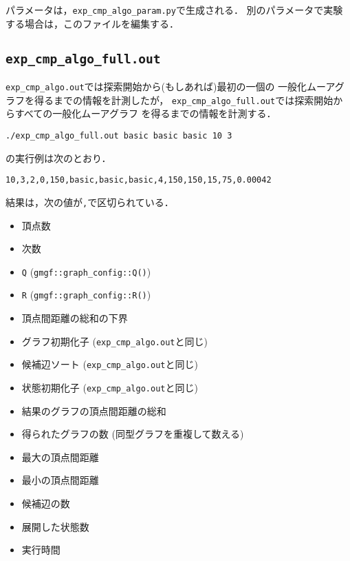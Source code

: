 パラメータは，\texttt{exp\_cmp\_algo\_param.py}で生成される．
別のパラメータで実験する場合は，このファイルを編集する．

\subsection*{\texorpdfstring{\texttt{exp\_cmp\_algo\_full.out}}{exp\_cmp\_algo\_full.out}}\label{expux5fcmpux5falgoux5ffull.out}

\texttt{exp\_cmp\_algo.out}では探索開始から(もしあれば)最初の一個の
一般化ムーアグラフを得るまでの情報を計測したが，
\texttt{exp\_cmp\_algo\_full.out}では探索開始からすべての一般化ムーアグラフ
を得るまでの情報を計測する．

\begin{verbatim}
./exp_cmp_algo_full.out basic basic basic 10 3
\end{verbatim}

の実行例は次のとおり．

\begin{verbatim}
10,3,2,0,150,basic,basic,basic,4,150,150,15,75,0.00042
\end{verbatim}

結果は，次の値が\texttt{,}で区切られている．

\begin{itemize}
\tightlist
\item
  頂点数
\item
  次数
\item
  \texttt{Q} (\texttt{gmgf::graph\_config::Q()})
\item
  \texttt{R} (\texttt{gmgf::graph\_config::R()})
\item
  頂点間距離の総和の下界
\item
  グラフ初期化子 (\texttt{exp\_cmp\_algo.out}と同じ)
\item
  候補辺ソート (\texttt{exp\_cmp\_algo.out}と同じ)
\item
  状態初期化子 (\texttt{exp\_cmp\_algo.out}と同じ)
\item
  結果のグラフの頂点間距離の総和
\item
  得られたグラフの数 (同型グラフを重複して数える)
\item
  最大の頂点間距離
\item
  最小の頂点間距離
\item
  候補辺の数
\item
  展開した状態数
\item
  実行時間
\end{itemize}

